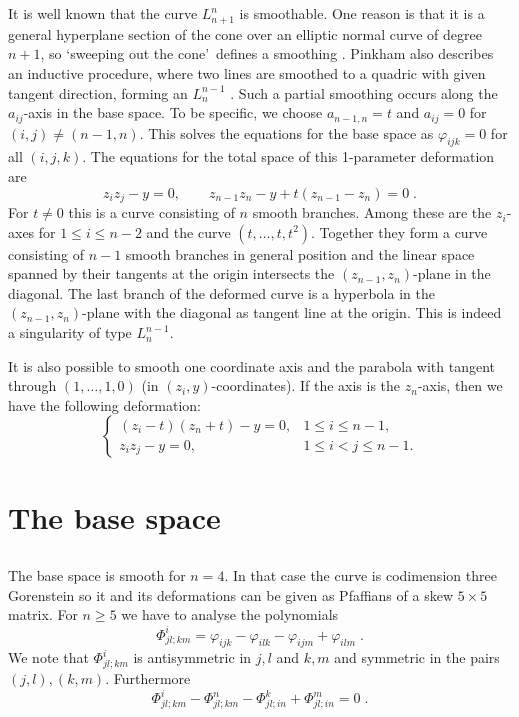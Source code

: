 \documentclass[12pt,a4paper]{amsart}  %
\newcommand{\vp}{\varphi}
\theoremstyle{definition}
\theoremstyle{remark}
\begin{document}
\subsection{}\label{sect_smooth}
It is well known that the curve $L_{n+1}^n$ is smoothable. 
One reason is that it is a general hyperplane section of the cone over an
elliptic normal  curve of degree $n+1$, so \lq sweeping out the cone\rq\ defines
a smoothing \cite[(7.6)]{Pi}.
Pinkham also describes an inductive
procedure, where two lines are smoothed to a quadric with given tangent direction,
forming an $L_{n}^{n-1}$
\cite[(11.13)]{Pi}. Such a partial smoothing occurs along the 
$a_{ij}$-axis in the base space. To be specific, we choose
$a_{n-1,n}=t$ and $a_{ij}=0$ for $(i,j)\neq (n-1,n)$. This solves the equations for the
base space as $\vp_{ijk}=0$ for all $(i,j,k)$. The equations for the total space of this
1-parameter deformation are
\[
z_iz_j-y=0,  \qquad z_{n-1}z_n-y+t (z_{n-1}-z_n)=0\;.
\]
For $t\neq0$ this is a curve consisting of  $n$ smooth branches.
Among  these are  the  $z_i$-axes for $1\leq i\leq n-2$ and the curve $(t,\dots,t,t^2)$.
Together they form a curve consisting of  $n-1$ smooth branches in general position
and the linear space spanned by their tangents at the origin  intersects the 
$(z_{n-1},z_n)$-plane in the diagonal.  The last branch of the deformed curve
is a hyperbola in the 
$(z_{n-1},z_n)$-plane with the diagonal as tangent line at the origin. This is
indeed a singularity of type $L_{n}^{n-1}$.

It is also possible to smooth one coordinate axis and the parabola with tangent
through $(1,\dots,1,0)$ (in $(z_i,y)$-coordinates).
If the axis is the $z_n$-axis, then we  have the following deformation:
\[
\begin{cases}
(z_{i}-t)(z_n+t)-y=0, & 1\leq i \leq n-1,\\
 z_iz_j-y=0,  &1\leq i < j\leq n-1.
\end{cases}
\]





 \section{The base space}
 
 \subsection{}
The base space is smooth for $n=4$. In that case the curve is codimension three Gorenstein
so it and its deformations can be given as Pfaffians of a skew $5\times5$ matrix.
For $n\geq5$ we have to analyse the polynomials
\[
\Phi^i_{jl;km}=\vp_{ijk}-\vp_{ilk}-\vp_{ijm}+\vp_{ilm}\;.
\]
We note that $\Phi^i_{jl;km}$ is antisymmetric in $j,l$ and $k,m$ and symmetric in the
pairs $(j,l),(k,m)$. Furthermore
\begin{equation}\label{phi-eqn}
\Phi^i_{jl;km}-\Phi^n_{jl;km}-\Phi^k_{jl;in}+\Phi^m_{jl;in}=0\;.
\end{equation}
\end{document}
